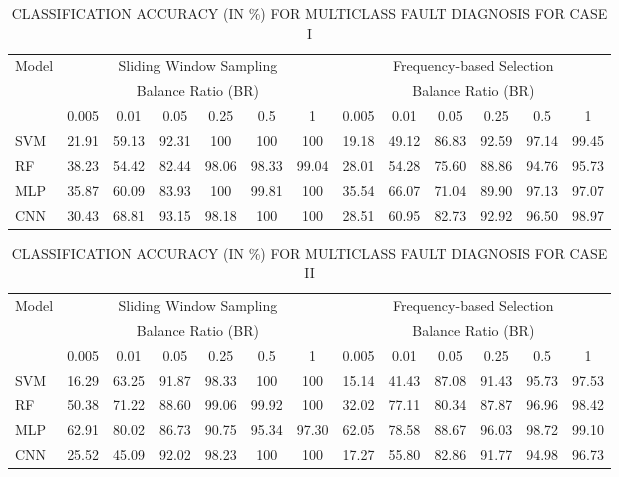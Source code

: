 \documentclass[conference,twocolumn]{IEEEtran}
\begin{document}
\begin{table}[htbp]
\centering
\caption{CLASSIFICATION ACCURACY (IN \%) FOR MULTICLASS FAULT DIAGNOSIS FOR CASE I}
\label{tab:accuracy_caseI}
\begin{tabular}{lcccccccccccc}
\toprule
\multirow{2}{*}{Model} & \multicolumn{6}{c}{Sliding Window Sampling} & \multicolumn{6}{c}{Frequency-based Selection} \\
 & \multicolumn{6}{c}{Balance Ratio (BR)} & \multicolumn{6}{c}{Balance Ratio (BR)} \\
 & 0.005 & 0.01 & 0.05 & 0.25 & 0.5 & 1 & 0.005 & 0.01 & 0.05 & 0.25 & 0.5 & 1 \\
\toprule
SVM & 21.91 & 59.13 & 92.31 & 100 & 100 & 100 & 19.18 & 49.12 & 86.83 & 92.59 & 97.14 & 99.45 \\
RF & 38.23 & 54.42 & 82.44 & 98.06 & 98.33 & 99.04 & 28.01 & 54.28 & 75.60 & 88.86 & 94.76 & 95.73 \\
MLP & 35.87 & 60.09 & 83.93 & 100 & 99.81 & 100 & 35.54 & 66.07 & 71.04 & 89.90 & 97.13 & 97.07 \\
CNN & 30.43 & 68.81 & 93.15 & 98.18 & 100 & 100 & 28.51 & 60.95 & 82.73 & 92.92 & 96.50 & 98.97 \\
\toprule
\end{tabular}
\end{table}

\begin{table}[htbp]
\centering
\caption{CLASSIFICATION ACCURACY (IN \%) FOR MULTICLASS FAULT DIAGNOSIS FOR CASE II}
\label{tab:accuracy_caseII}
\begin{tabular}{lcccccccccccc}
\toprule
\multirow{2}{*}{Model} & \multicolumn{6}{c}{Sliding Window Sampling} & \multicolumn{6}{c}{Frequency-based Selection} \\
 & \multicolumn{6}{c}{Balance Ratio (BR)} & \multicolumn{6}{c}{Balance Ratio (BR)} \\
 & 0.005 & 0.01 & 0.05 & 0.25 & 0.5 & 1 & 0.005 & 0.01 & 0.05 & 0.25 & 0.5 & 1 \\
\toprule
SVM & 16.29 & 63.25 & 91.87 & 98.33 & 100 & 100 & 15.14 & 41.43 & 87.08 & 91.43 & 95.73 & 97.53 \\
RF & 50.38 & 71.22 & 88.60 & 99.06 & 99.92 & 100 & 32.02 & 77.11 & 80.34 & 87.87 & 96.96 & 98.42 \\
MLP & 62.91 & 80.02 & 86.73 & 90.75 & 95.34 & 97.30 & 62.05 & 78.58 & 88.67 & 96.03 & 98.72 & 99.10 \\
CNN & 25.52 & 45.09 & 92.02 & 98.23 & 100 & 100 & 17.27 & 55.80 & 82.86 & 91.77 & 94.98 & 96.73 \\
\toprule
\end{tabular}
\end{table}
\end{document}

